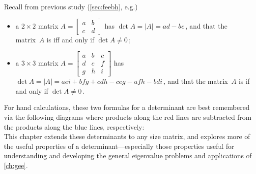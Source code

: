 Recall from previous study (\autoref{sec:feebh}, e.g.)
\begin{itemize}
\item a \(2\times 2\) matrix \(A=\begin{bmatrix} a&b\\c&d \end{bmatrix}\) has  \(\det A=|A|=ad-bc\)\,, and that the matrix~\(A\) is   iff and only if \(\det A\neq0\)\,;
\item a \(3\times 3\) matrix \(A=\begin{bmatrix} a&b&c\\d&e&f\\g&h&i \end{bmatrix}\) has  \(\det A=|A|=aei+bfg+cdh-ceg-afh-bdi\)\,, and that the matrix~\(A\) is  if and only if \(\det A\neq0\)\,.
\end{itemize}
For hand calculations, these two formulas for a determinant are best remembered via the following diagrams where products along the red lines are subtracted from the products along the blue lines, respectively:
\begin{equation}

\label{eq:dets23b}
\end{equation}
This chapter extends these determinants to any size matrix, and explores more of the useful properties of a determinant---especially those properties useful for understanding and developing the general eigenvalue problems and applications of \autoref{ch:gee}.





\endinput

